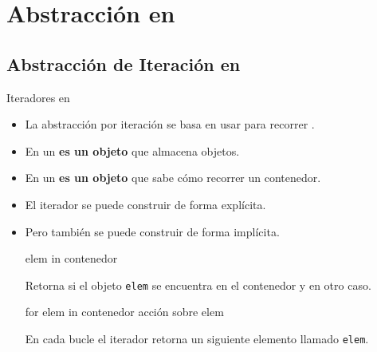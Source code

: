 \documentclass[10pt,envcountsect,spanish]{beamer}
\begin{document}
\section{Abstracción en }





\subsection{Abstracción de Iteración en }



\begin{frame}[fragile]{Iteradores en }

\begin{itemize}\setlength{\itemsep}{2mm}

\item La abstracción por iteración se basa en usar  para recorrer .

\item En  un  \textbf{es un objeto} que almacena objetos.

\item En  un  \textbf{es un objeto} que sabe cómo recorrer un contenedor.

\item El iterador se puede construir de forma explícita. 

\item Pero también se puede construir de forma implícita. 

\hfil
\begin{minipage}{.4\textwidth}
\begin{pyverbatim}[][frame = single]
elem in contenedor
\end{pyverbatim}

\small
Retorna  si el  objeto \texttt{elem} se encuentra en el contenedor y  en otro caso.


\end{minipage}
\hfil\begin{minipage}{.4\textwidth}
\begin{pyverbatim}[][frame = single]
for elem in contenedor
    acción sobre elem
\end{pyverbatim}

\small
En cada bucle el iterador retorna un siguiente elemento llamado \texttt{elem}.

\end{minipage}


\end{itemize}

\end{frame}
\end{document}
